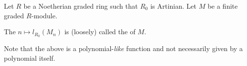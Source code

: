 \documentclass[12pt]{article}	%
\DeclareMathOperator{\gr}{gr}
\begin{document}
\begin{defn}%
	Let $R$ be a Noetherian graded ring such that $R_0$ is Artinian. Let $M$ be a finite graded $R$-module.

	The $n \mapsto l_{R_0}(M_n)$ is (loosely) called the  of $M.$
\end{defn}
Note that the above is a polynomial-\emph{like} function and not necessarily given by a polynomial itself.






\end{document}
